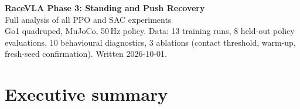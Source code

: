 \documentclass[11pt,a4paper]{article}
\begin{document}
\begin{center}
{\LARGE\bfseries\color{rblue} RaceVLA Phase 3: Standing and Push Recovery}\\[4pt]
{\Large Full analysis of all PPO and SAC experiments}\\[6pt]
{\small Go1 quadruped, MuJoCo, 50\,Hz policy. Data: 13 training runs, 8 held-out policy evaluations, 10 behavioural diagnostics, 3 ablations (contact threshold, warm-up, fresh-seed confirmation). Written 2026-10-01.}
\end{center}
\vspace{4pt}

\section{Executive summary}
\end{document}
